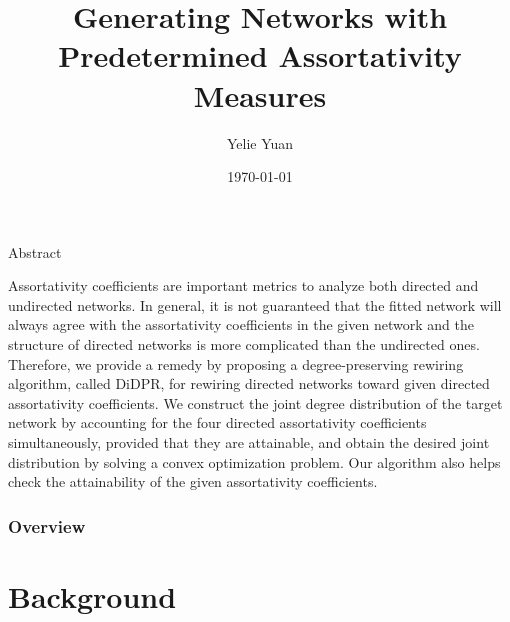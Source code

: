 \documentclass[xcolor=dvipsnames, compress, 10pt]{beamer}
\title{Generating Networks with Predetermined Assortativity Measures}
\author{Yelie Yuan}
\institute{Department of Statistics, University of Connecticut}
\date{\today}
\theoremstyle{remark}
\begin{document}
\frame{\titlepage}

\begin{frame}{Abstract}

Assortativity coefficients are important metrics to analyze both directed and
undirected networks. In general, it is not guaranteed that the fitted network
will always agree with the assortativity coefficients in the given network and
the structure of directed networks is more complicated than the undirected ones.
Therefore, we provide a remedy by proposing a degree-preserving rewiring
algorithm, called DiDPR, for rewiring directed networks toward given directed
assortativity coefficients. We construct the joint degree distribution of the
target network by accounting for the four directed assortativity coefficients
simultaneously, provided that they are attainable, and obtain the desired joint
distribution by solving a convex optimization problem. Our algorithm also helps
check the attainability of the given assortativity coefficients.
	
\end{frame}


\begin{frame}
	\frametitle{Overview}
	\tableofcontents
\end{frame}


\section{Background}
\end{document}
